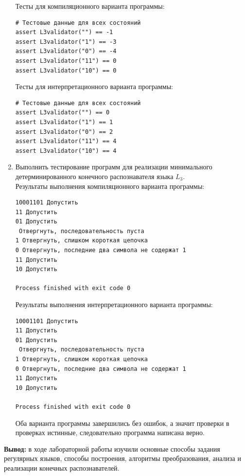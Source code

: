 \documentclass[a4paper,14pt]{extarticle}
\begin{document}
\begin{enumerate}[1.]
Тесты для компиляционного варианта программы:\\
\begin{verbatim}
# Тестовые данные для всех состояний
assert L3validator("") == -1
assert L3validator("1") == -3
assert L3validator("0") == -4
assert L3validator("11") == 0
assert L3validator("10") == 0
\end{verbatim}

Тесты для интерпретационного варианта программы:\\
\begin{verbatim}
# Тестовые данные для всех состояний
assert L3validator("") == 0
assert L3validator("1") == 1
assert L3validator("0") == 2
assert L3validator("11") == 4
assert L3validator("10") == 4
\end{verbatim}

\item Выполнить тестирование программ для реализации минимального
детерминированного конечного распознавателя языка $L_3$.\\

Результаты выполнения компиляционного варианта программы:\\
\begin{verbatim}
10001101 Допустить
11 Допустить
01 Допустить
 Отвергнуть, последовательность пуста
1 Отвергнуть, слишком короткая цепочка
0 Отвергнуть, последние два символа не содержат 1
11 Допустить
10 Допустить

Process finished with exit code 0
\end{verbatim}

Результаты выполнения интерпретационного варианта программы:\\
\begin{verbatim}
10001101 Допустить
11 Допустить
01 Допустить
 Отвергнуть, последовательность пуста
1 Отвергнуть, слишком короткая цепочка
0 Отвергнуть, последние два символа не содержат 1
11 Допустить
10 Допустить

Process finished with exit code 0
\end{verbatim}

Оба варианта программы завершились без ошибок, а значит проверки 
в проверках истинные, следовательно программа написана верно.

\end{enumerate}

\textbf{Вывод: } в ходе лабораторной работы изучили основные способы задания регулярных языков, 
способы построения, алгоритмы преобразования, анализа и реализации конечных 
распознавателей.
\end{document}
